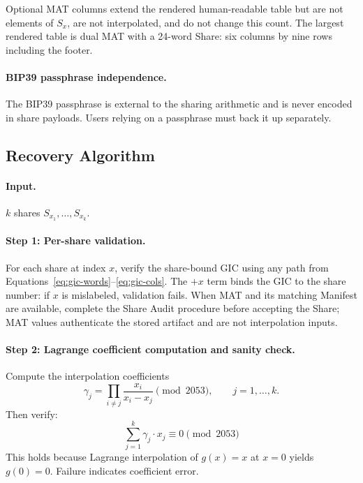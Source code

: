 \documentclass[11pt]{article}
\begin{document}
Optional MAT columns extend the rendered human-readable table but are not elements of $S_x$, are not interpolated, and do not change this count. The largest rendered table is dual MAT with a 24-word Share: six columns by nine rows including the footer.

\paragraph{BIP39 passphrase independence.} The BIP39 passphrase is external to the sharing arithmetic and is never encoded in share payloads. Users relying on a passphrase must back it up separately.

\subsection{Recovery Algorithm}
\label{sec:recovery}

\paragraph{Input.} $k$ shares $S_{x_1}, \ldots, S_{x_k}$.

\paragraph{Step 1: Per-share validation.} For each share at index $x$, verify the share-bound GIC using any path from Equations~\eqref{eq:gic-words}--\eqref{eq:gic-cols}. The $+x$ term binds the GIC to the share number: if $x$ is mislabeled, validation fails. When MAT and its matching Manifest are available, complete the Share Audit procedure before accepting the Share; MAT values authenticate the stored artifact and are not interpolation inputs.

\paragraph{Step 2: Lagrange coefficient computation and sanity check.} Compute the interpolation coefficients
\[
    \gamma_j = \prod_{i \neq j} \frac{x_i}{x_i - x_j} \pmod{2053},
    \qquad j = 1, \ldots, k.
\]
Then verify:
\begin{equation}
    \sum_{j=1}^{k} \gamma_j \cdot x_j \equiv 0 \pmod{2053} \label{eq:lagrange-sanity}
\end{equation}
This holds because Lagrange interpolation of $g(x) = x$ at $x = 0$ yields $g(0) = 0$. Failure indicates coefficient error.
\end{document}
